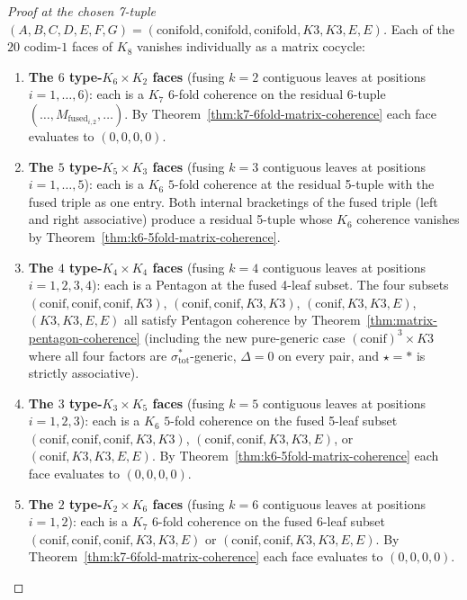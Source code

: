 \begin{proof}[Proof at the chosen 7-tuple
 $(A, B, C, D, E, F, G) = (\mathrm{conifold},
 \mathrm{conifold}, \mathrm{conifold}, K3, K3, E, E)$]
Each of the $20$ codim-$1$ faces of $K_8$ vanishes individually as a
matrix cocycle:
\begin{enumerate}
\item \textbf{The $6$ type-$K_6 \times K_2$ faces} \textup{(}fusing
 $k = 2$ contiguous leaves at positions $i = 1, \ldots, 6$\textup{):}
 each is a $K_7$ $6$-fold coherence on the residual 6-tuple
 $(\ldots, M_{\mathrm{fused}_{i,2}}, \ldots)$. By
 Theorem~\ref{thm:k7-6fold-matrix-coherence} each face evaluates
 to $(0, 0, 0, 0)$.
\item \textbf{The $5$ type-$K_5 \times K_3$ faces} \textup{(}fusing
 $k = 3$ contiguous leaves at positions $i = 1, \ldots, 5$\textup{):}
 each is a $K_6$ $5$-fold coherence at the residual 5-tuple with
 the fused triple as one entry. Both internal bracketings of the
 fused triple \textup{(}left and right associative\textup{)}
 produce a residual 5-tuple whose $K_6$ coherence vanishes by
 Theorem~\ref{thm:k6-5fold-matrix-coherence}.
\item \textbf{The $4$ type-$K_4 \times K_4$ faces} \textup{(}fusing
 $k = 4$ contiguous leaves at positions $i = 1, 2, 3, 4$\textup{):}
 each is a Pentagon at the fused 4-leaf subset. The four subsets
 $(\mathrm{conif}, \mathrm{conif}, \mathrm{conif}, K3)$,
 $(\mathrm{conif}, \mathrm{conif}, K3, K3)$,
 $(\mathrm{conif}, K3, K3, E)$, $(K3, K3, E, E)$ all satisfy
 Pentagon coherence by Theorem~\ref{thm:matrix-pentagon-coherence}
 \textup{(}including the new pure-generic case
 $(\mathrm{conif})^3 \times K3$ where all four factors are
 $\sigma_{\mathrm{tot}}^*$-generic, $\Delta = 0$ on every pair,
 and $\star = \ast$ is strictly associative\textup{).}
\item \textbf{The $3$ type-$K_3 \times K_5$ faces} \textup{(}fusing
 $k = 5$ contiguous leaves at positions $i = 1, 2, 3$\textup{):}
 each is a $K_6$ $5$-fold coherence on the fused 5-leaf subset
 $(\mathrm{conif}, \mathrm{conif}, \mathrm{conif}, K3, K3)$,
 $(\mathrm{conif}, \mathrm{conif}, K3, K3, E)$, or
 $(\mathrm{conif}, K3, K3, E, E)$. By
 Theorem~\ref{thm:k6-5fold-matrix-coherence} each face evaluates
 to $(0, 0, 0, 0)$.
\item \textbf{The $2$ type-$K_2 \times K_6$ faces} \textup{(}fusing
 $k = 6$ contiguous leaves at positions $i = 1, 2$\textup{):}
 each is a $K_7$ $6$-fold coherence on the fused 6-leaf subset
 $(\mathrm{conif}, \mathrm{conif}, \mathrm{conif}, K3, K3, E)$ or
 $(\mathrm{conif}, \mathrm{conif}, K3, K3, E, E)$. By
 Theorem~\ref{thm:k7-6fold-matrix-coherence} each face evaluates
 to $(0, 0, 0, 0)$.
\end{enumerate}


\end{proof}
